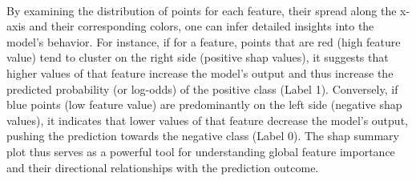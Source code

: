 \documentclass[12pt,a4paper]{report}
\begin{document}
\\
By examining the distribution of points for each feature, their spread along the x-axis and their corresponding colors, one can infer detailed insights into the model's behavior. For instance, if for a feature, points that are red (high feature value) tend to cluster on the right side (positive \gls{shap} values), it suggests that higher values of that feature increase the model's output and thus increase the predicted probability (or log-odds) of the positive class (Label 1). Conversely, if blue points (low feature value) are predominantly on the left side (negative \gls{shap} values), it indicates that lower values of that feature decrease the model's output, pushing the prediction towards the negative class (Label 0). The \gls{shap} summary plot thus serves as a powerful tool for understanding global feature importance and their directional relationships with the prediction outcome.
\end{document}
